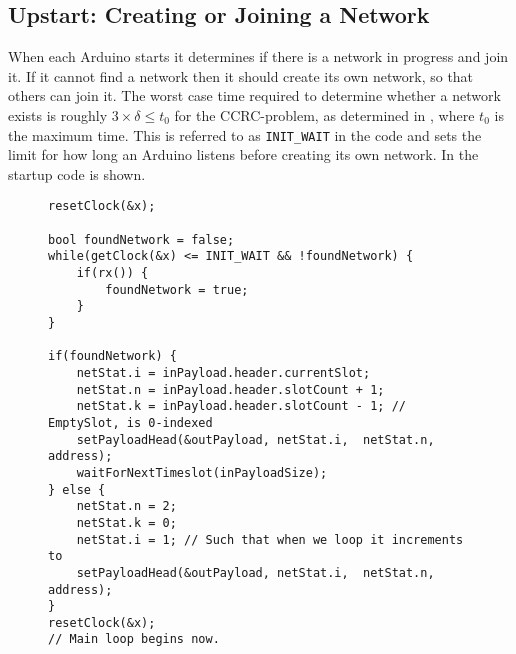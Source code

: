 \subsection{Upstart: Creating or Joining a Network}
When each Arduino starts it determines if there is a network in progress and join it. 
If it cannot find a network then it should create its own network, so that others can join it. 
The worst case time required to determine whether a network exists is roughly $3 \times \delta \leq t_0$ for the CCRC-problem, as determined in , where $t_0$ is the maximum time. 
This is referred to as \texttt{INIT\_WAIT} in the code and sets the limit for how long an Arduino listens before creating its own network. 
In  the startup code is shown. 
\begin{figure}
\begin{lstlisting}[style=customc,caption={Startup, if a network is found join it, if not create one.},label={lst:ccrc:startup}]
resetClock(&x);

bool foundNetwork = false;
while(getClock(&x) <= INIT_WAIT && !foundNetwork) {
    if(rx()) {
        foundNetwork = true;
    }
}

if(foundNetwork) {
    netStat.i = inPayload.header.currentSlot;
    netStat.n = inPayload.header.slotCount + 1;
    netStat.k = inPayload.header.slotCount - 1; // EmptySlot, is 0-indexed
    setPayloadHead(&outPayload, netStat.i,  netStat.n, address);
    waitForNextTimeslot(inPayloadSize);
} else {
    netStat.n = 2;
    netStat.k = 0;
    netStat.i = 1; // Such that when we loop it increments to
    setPayloadHead(&outPayload, netStat.i,  netStat.n, address);
}
resetClock(&x);
// Main loop begins now.
\end{lstlisting}
\end{figure}
